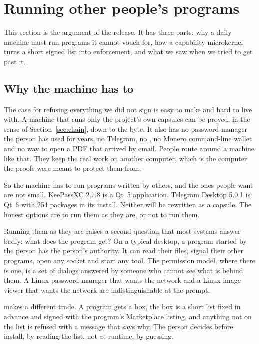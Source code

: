\section{Running other people's programs}\label{sec:box}

This section is the argument of the release. It has three parts: why a daily machine must run programs it cannot vouch for, how a capability microkernel turns a short signed list into enforcement, and what we saw when we tried to get past it.

\subsection{Why the machine has to}

The case for refusing everything we did not sign is easy to make and hard to live with. A machine that runs only the project's own capsules can be proved, in the sense of Section~\ref{sec:chain}, down to the byte. It also has no password manager the person has used for years, no Telegram, no , no Monero command-line wallet and no way to open a PDF that arrived by email. People route around a machine like that. They keep the real work on another computer, which is the computer the proofs were meant to protect them from.

So the machine has to run programs written by others, and the ones people want are not small. KeePassXC 2.7.8 is a Qt~5 application. Telegram Desktop 5.0.1 is Qt~6 with 254 packages in its install. Neither will be rewritten as a capsule. The honest options are to run them as they are, or not to run them.

Running them as they are raises a second question that most systems answer badly: what does the program get? On a typical desktop, a program started by the person has the person's authority. It can read their files, signal their other programs, open any socket and start any tool. The permission model, where there is one, is a set of dialogs answered by someone who cannot see what is behind them. A Linux password manager that wants the network and a Linux image viewer that wants the network are indistinguishable at the prompt.

\nonos{} makes a different trade. A program gets a box, the box is a short list fixed in advance and signed with the program's Marketplace listing, and anything not on the list is refused with a message that says why. The person decides before install, by reading the list, not at runtime, by guessing.


